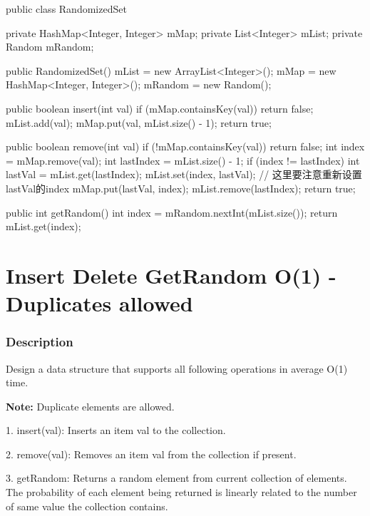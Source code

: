 \begin{Code}
public class RandomizedSet {

    private HashMap<Integer, Integer> mMap;
    private List<Integer> mList;
    private Random mRandom;

    public RandomizedSet() {
        mList = new ArrayList<Integer>();
        mMap = new HashMap<Integer, Integer>();
        mRandom = new Random();
    }

    public boolean insert(int val) {
        if (mMap.containsKey(val)) {
            return false;
        }
        mList.add(val);
        mMap.put(val, mList.size() - 1);
        return true;
    }

    public boolean remove(int val) {
        if (!mMap.containsKey(val)) {
            return false;
        }
        int index = mMap.remove(val);
        int lastIndex = mList.size() - 1;
        if (index != lastIndex) {
            int lastVal = mList.get(lastIndex);
            mList.set(index, lastVal);
            // 这里要注意重新设置lastVal的index
            mMap.put(lastVal, index);
        }
        mList.remove(lastIndex);
        return true;
    }

    public int getRandom() {
        int index = mRandom.nextInt(mList.size());
        return mList.get(index);
    }
}

\end{Code}

\newpage

\section{Insert Delete GetRandom O(1) - Duplicates allowed} %

\subsubsection{Description}
Design a data structure that supports all following operations in average O(1) time.

\textbf{Note:} Duplicate elements are allowed.

1. insert(val): Inserts an item val to the collection.

2. remove(val): Removes an item val from the collection if present.

3. getRandom: Returns a random element from current collection of elements. The probability of each element being returned is linearly related to the number of same value the collection contains.

